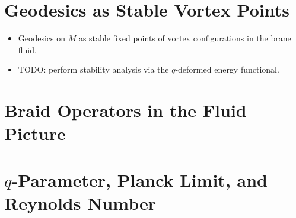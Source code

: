 \section{Geodesics as Stable Vortex Points}
\label{sec:geodesic-vortices}

\begin{itemize}
  \item Geodesics on $M$ as stable fixed points of vortex configurations
        in the brane fluid.
  \item TODO: perform stability analysis via the $q$-deformed energy
        functional.
\end{itemize}


\section{Braid Operators in the Fluid Picture}
\label{sec:braid-fluid}



\section{$q$-Parameter, Planck Limit, and Reynolds Number}
\label{sec:planck-reynolds}

